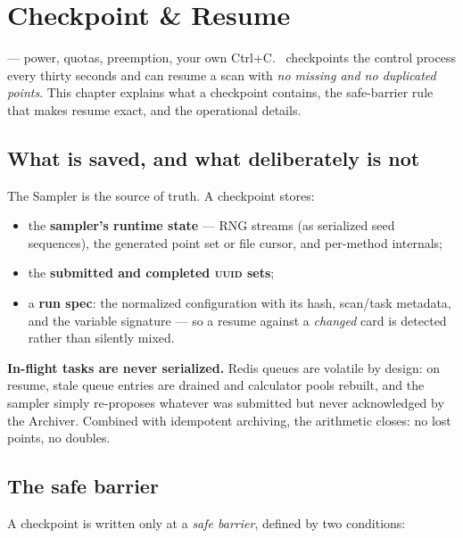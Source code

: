 \chapter{Checkpoint \& Resume}
\label{ch:checkpoint}

 --- power, quotas, preemption, your own Ctrl+C. \Jtwo\
checkpoints the control process every thirty seconds and can resume a scan with
\emph{no missing and no duplicated points}. This chapter explains what a checkpoint
contains, the safe-barrier rule that makes resume exact, and the operational details.

\section{What is saved, and what deliberately is not}
\label{sec:checkpoint-contents}

The Sampler is the source of truth. A checkpoint stores:

\begin{itemize}
  \item the \textbf{sampler's runtime state} --- RNG streams (as serialized seed
        sequences), the generated point set or file cursor, and per-method internals;
  \item the \textbf{submitted and completed \textsc{uuid} sets};
  \item a \textbf{run spec}: the normalized configuration with its hash, scan/task
        metadata, and the variable signature --- so a resume against a \emph{changed}
        card is detected rather than silently mixed.
\end{itemize}

\begin{jnote}
\textbf{In-flight tasks are never serialized.} Redis queues are volatile by design: on
resume, stale queue entries are drained and calculator pools rebuilt, and the sampler
simply re-proposes whatever was submitted but never acknowledged by the Archiver.
Combined with idempotent archiving, the arithmetic closes: no lost points, no doubles.
\end{jnote}

\section{The safe barrier}
\label{sec:safe-barrier}

A checkpoint is written only at a \emph{safe barrier}, defined by two conditions:

